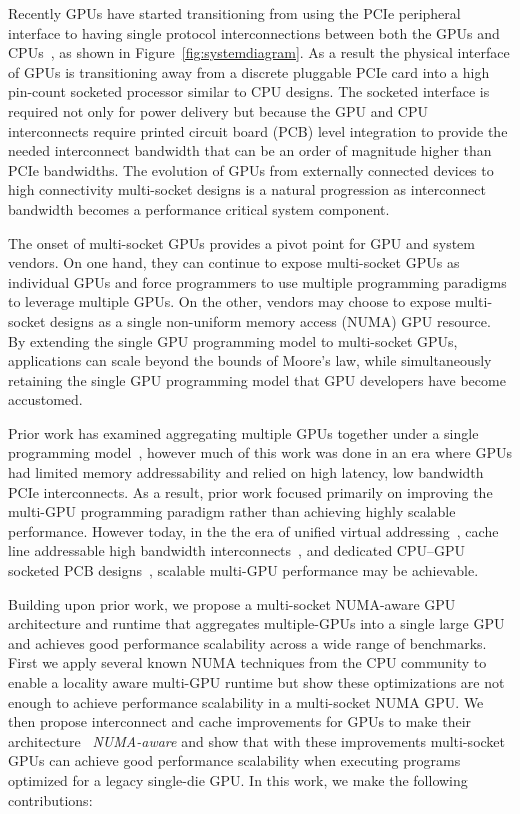 Recently GPUs have started transitioning from using the PCIe peripheral 
interface to having single protocol interconnections between both the GPUs and 
CPUs~\cite{dgx,SierraHPC,AMDINFINITYFABRIC}, as shown in 
Figure~\ref{fig:systemdiagram}. As a result the physical interface of GPUs is 
transitioning away from a discrete pluggable PCIe card into a high pin-count 
socketed processor similar to CPU designs. The socketed interface is required 
not only for power delivery but because the GPU and CPU interconnects require 
printed circuit board (PCB) level integration to provide the needed 
interconnect bandwidth that can be an order of magnitude higher than PCIe 
bandwidths. The evolution of GPUs from externally connected devices to high 
connectivity multi-socket designs is a natural progression as interconnect 
bandwidth becomes a performance critical system component.

The onset of multi-socket GPUs provides a pivot point for GPU and system 
vendors. On one hand, they can continue to expose multi-socket GPUs as 
individual GPUs and force programmers to use multiple programming paradigms to 
leverage multiple GPUs. On the other, vendors may choose to expose multi-socket 
designs as a single non-uniform memory access (NUMA) GPU resource.  By 
extending the single GPU programming model to multi-socket GPUs,  applications 
can scale beyond the bounds of Moore's law, while simultaneously retaining the 
single GPU programming model that GPU developers have become accustomed.

Prior work has examined aggregating multiple GPUs together under a single
programming model~\cite{lee2013transparent,Cabezas2015}, however much of this 
work
was done in an era where GPUs had limited memory addressability
and relied on high latency, low bandwidth PCIe interconnects.
As a result, prior work focused primarily on improving the multi-GPU programming
paradigm rather than achieving highly scalable performance.
However today, in the the era of unified virtual addressing~\cite{UVM},
cache line addressable high bandwidth interconnects~\cite{NVLINK}, and dedicated 
CPU--GPU
socketed PCB designs~\cite{SierraHPC}, scalable multi-GPU performance
may be achievable.

Building upon prior work, we propose a multi-socket NUMA-aware GPU architecture 
and runtime that aggregates multiple-GPUs into a single large GPU and achieves 
good performance scalability across a wide range of benchmarks.  First we apply 
several known NUMA techniques from the CPU community to enable a locality aware 
multi-GPU runtime but show these optimizations are not enough to achieve 
performance scalability in a multi-socket NUMA GPU.  We then propose 
interconnect and cache improvements for GPUs to make their architecture 
~\textit{NUMA-aware} and show that with these improvements multi-socket GPUs can 
achieve good performance scalability when executing programs optimized for a 
legacy single-die GPU. In this work, we make the following contributions:

